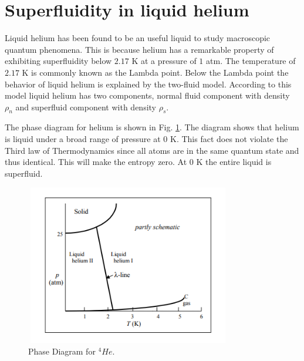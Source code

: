 \section{Superfluidity in liquid helium}
Liquid helium has been found to be an useful liquid to study macroscopic quantum phenomena. This is because helium has a remarkable property of exhibiting superfluidity below $2.17$ K at a pressure of $1$ atm. The temperature of $2.17$ K is commonly known as the Lambda point. Below the Lambda point the behavior of liquid helium is explained by the two-fluid model. According to this model liquid helium has two components, normal fluid component with density $\rho_n$ and superfluid component with density $\rho_s$. 

The phase diagram for helium is shown in Fig. \ref{phaseDiaHe}. The diagram shows that helium is liquid under a broad range of pressure at $0$ K. This fact does not violate the Third law of Thermodynamics since all atoms are in the same quantum state and thus identical. This will make the entropy zero. At $0$ K the entire liquid is superfluid. 
\begin{figure}[H]
\centering 
\includegraphics[width=90mm, height=70mm]{Nucleation_Experiment/He_phaseDiagram.png}
\caption{Phase Diagram for $^4He$. \cite{Vinen:808382}}
\label{phaseDiaHe}
\end{figure}


